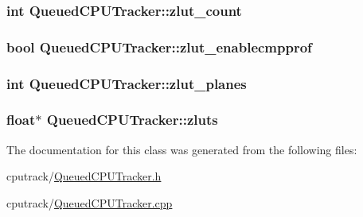 \subsubsection[{\texorpdfstring{zlut\+\_\+count}{zlut_count}}]{\setlength{\rightskip}{0pt plus 5cm}int Queued\+C\+P\+U\+Tracker\+::zlut\+\_\+count\hspace{0.3cm}{\ttfamily [private]}}\hypertarget{class_queued_c_p_u_tracker_a2848d660cb1607f7bd135fd821dd8108}{}\label{class_queued_c_p_u_tracker_a2848d660cb1607f7bd135fd821dd8108}
\subsubsection[{\texorpdfstring{zlut\+\_\+enablecmpprof}{zlut_enablecmpprof}}]{\setlength{\rightskip}{0pt plus 5cm}bool Queued\+C\+P\+U\+Tracker\+::zlut\+\_\+enablecmpprof\hspace{0.3cm}{\ttfamily [private]}}\hypertarget{class_queued_c_p_u_tracker_a533b617109af0be5d7b8634e947119d8}{}\label{class_queued_c_p_u_tracker_a533b617109af0be5d7b8634e947119d8}
\subsubsection[{\texorpdfstring{zlut\+\_\+planes}{zlut_planes}}]{\setlength{\rightskip}{0pt plus 5cm}int Queued\+C\+P\+U\+Tracker\+::zlut\+\_\+planes\hspace{0.3cm}{\ttfamily [private]}}\hypertarget{class_queued_c_p_u_tracker_a4287f68021755bcf62e4ddf9b8b48215}{}\label{class_queued_c_p_u_tracker_a4287f68021755bcf62e4ddf9b8b48215}
\subsubsection[{\texorpdfstring{zluts}{zluts}}]{\setlength{\rightskip}{0pt plus 5cm}float$\ast$ Queued\+C\+P\+U\+Tracker\+::zluts\hspace{0.3cm}{\ttfamily [private]}}\hypertarget{class_queued_c_p_u_tracker_a1bad88f56b12ea8de35879acd07f4c8e}{}\label{class_queued_c_p_u_tracker_a1bad88f56b12ea8de35879acd07f4c8e}


The documentation for this class was generated from the following files\+:\begin{DoxyCompactItemize}
\item 
cputrack/\hyperlink{_queued_c_p_u_tracker_8h}{Queued\+C\+P\+U\+Tracker.\+h}\item 
cputrack/\hyperlink{_queued_c_p_u_tracker_8cpp}{Queued\+C\+P\+U\+Tracker.\+cpp}\end{DoxyCompactItemize}
